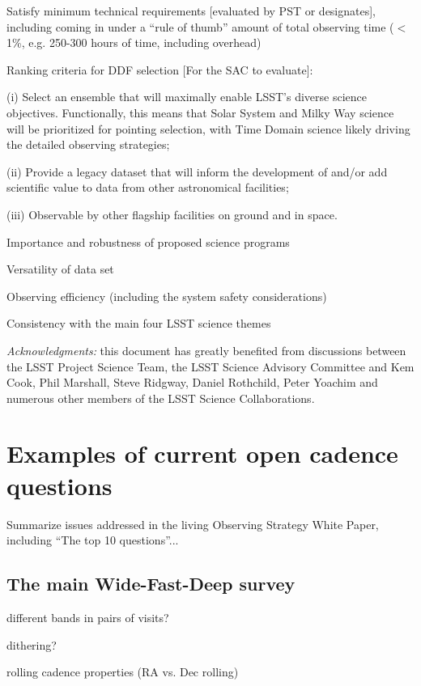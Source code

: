 \documentclass[DM,lsstdraft,toc,usenatbib]{lsstdoc}
\begin{document}
Satisfy minimum technical requirements [evaluated by PST or designates], including coming in under a 
``rule of thumb'' amount of total observing time ($<$1\%, e.g. 250-300 hours of time, including overhead)

Ranking criteria for DDF selection [For the SAC to evaluate]:  

(i) Select an ensemble that will maximally enable LSST’s diverse science objectives. Functionally, this means that Solar System and Milky Way science will be prioritized for pointing selection, with Time Domain science likely driving the detailed observing strategies;  

(ii) Provide a legacy dataset that will inform the development of and/or add scientific value to data from other astronomical facilities;  

(iii) Observable by other flagship facilities on ground and in space.



Importance and robustness of proposed science programs

Versatility of data set

Observing efficiency (including the system safety considerations) 

Consistency with the main four LSST science themes 


\vskip 0.0in
\newpage
{\it Acknowledgments:} this document has greatly benefited from discussions between 
the LSST Project Science Team, the LSST Science Advisory Committee and Kem Cook, 
Phil Marshall, Steve Ridgway, Daniel Rothchild, Peter Yoachim and numerous other members 
of the LSST Science Collaborations. 

\appendix


\section{Examples of current open cadence questions} 

Summarize issues addressed in the living Observing Strategy White Paper, 
including ``The top 10 questions''... 


\subsection{The main Wide-Fast-Deep survey} 

different bands in pairs of visits?

dithering? 

rolling cadence properties (RA vs. Dec rolling) 
\end{document}
